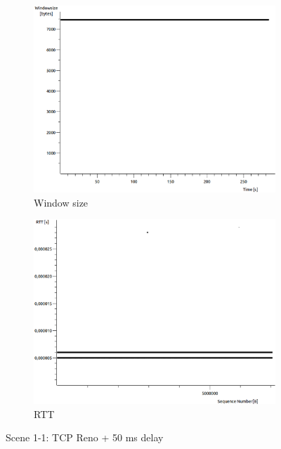 \documentclass[conference,a4paper]{IEEEtran}
\begin{document}
\begin{figure}
\begin{subfigure}[b]{0.2\textwidth}
  \includegraphics[width=\textwidth]{s1-1_wnd}
  \caption{Window size}
 \end{subfigure}
 \begin{subfigure}[b]{0.2\textwidth}
  \includegraphics[width=\textwidth]{s1-1_rtt}
  \caption{RTT}
 \end{subfigure}
 \caption{Scene 1-1: TCP Reno + 50 ms delay}
\end{figure}
\end{document}
